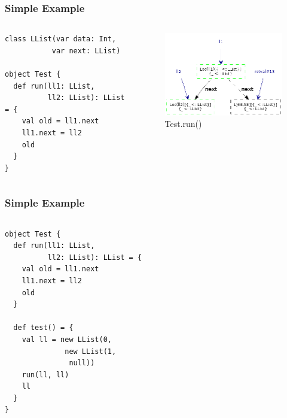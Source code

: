 \documentclass[hyperref={pdfpagelabels=false}]{beamer}
\begin{document}
\begin{frame}[fragile]
\frametitle{Simple Example}
  \begin{columns}
    \begin{column}{0.4\textwidth}
\begin{lstlisting}
class LList(var data: Int,
           var next: LList)

object Test {
  def run(ll1: LList,
          ll2: LList): LList = {
    val old = ll1.next
    ll1.next = ll2
    old
  }
}
\end{lstlisting}
    \end{column}
    \begin{column}{0.6\textwidth}
      \begin{figure}[t]
        \includegraphics[width=60mm]{images/e1.png}\\
        Test.run()
      \end{figure}
    \end{column}
  \end{columns}
\end{frame}

\begin{frame}[fragile]
\frametitle{Simple Example}
  \begin{columns}
    \begin{column}{0.4\textwidth}
\begin{lstlisting}
object Test {
  def run(ll1: LList,
          ll2: LList): LList = {
    val old = ll1.next
    ll1.next = ll2
    old
  }

  def test() = {
    val ll = new LList(0,
              new LList(1,
               null))
    run(ll, ll)
    ll
  }
}
\end{lstlisting}
    \end{column}
    \begin{column}{0.6\textwidth}
      \begin{figure}[t]
      \end{figure}
    \end{column}
  \end{columns}
\end{frame}
\end{document}
